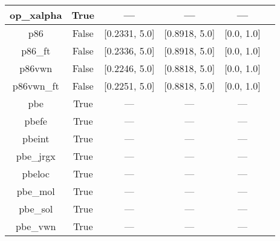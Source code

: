 \begin{tabular}{|c|c|c|c|c|l|}
    op\_xalpha &                  True &              --- &              --- &            --- &                      \cite{Tsuneda1999_10664,Tsuneda1999_5656} \\ \hline
           p86 &                 False &    [0.2331, 5.0] &    [0.8918, 5.0] &     [0.0, 1.0] &                                         \cite{Perdew1986_8822} \\ \hline
       p86\_ft &                 False &    [0.2336, 5.0] &    [0.8918, 5.0] &     [0.0, 1.0] &                                         \cite{Perdew1986_8822} \\ \hline
        p86vwn &                 False &    [0.2246, 5.0] &    [0.8818, 5.0] &     [0.0, 1.0] &                                         \cite{Perdew1986_8822} \\ \hline
    p86vwn\_ft &                 False &    [0.2251, 5.0] &    [0.8818, 5.0] &     [0.0, 1.0] &                                         \cite{Perdew1986_8822} \\ \hline
           pbe &                  True &              --- &              --- &            --- &                     \cite{Perdew1996_3865,Perdew1996_3865_err} \\ \hline
         pbefe &                  True &              --- &              --- &            --- &                                          \cite{Perez2015_3844} \\ \hline
        pbeint &                  True &              --- &              --- &            --- &                                      \cite{Fabiano2010_113104} \\ \hline
     pbe\_jrgx &                  True &              --- &              --- &            --- &                                      \cite{Pedroza2009_201106} \\ \hline
        pbeloc &                  True &              --- &              --- &            --- &                                   \cite{Constantin2012_035130} \\ \hline
      pbe\_mol &                  True &              --- &              --- &            --- &                                     \cite{delCampo2012_104108} \\ \hline
      pbe\_sol &                  True &              --- &              --- &            --- &                                       \cite{Perdew2008_136406} \\ \hline
      pbe\_vwn &                  True &              --- &              --- &            --- & \cite{Kraisler2010_042516,Perdew1996_3865,Perdew1996_3865_err} \\ \hline

\end{tabular}
